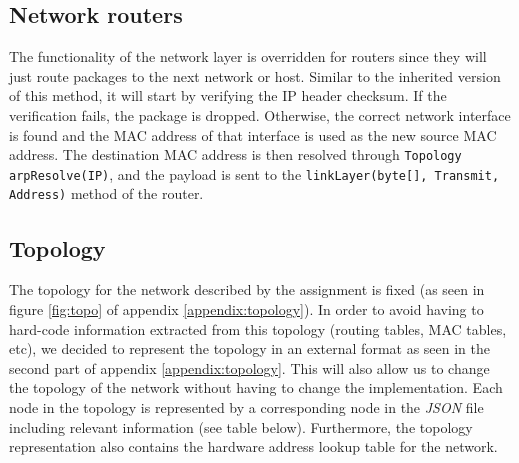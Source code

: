 \documentclass{scrartcl}
\begin{document}
\subsection{Network routers}
The functionality of the network layer is overridden for routers since they will just route packages to the next network or host. Similar to the inherited version of this method, it will start by verifying the IP header checksum. If the verification fails, the package is dropped. Otherwise, the correct network interface is found and the MAC address of that interface is used as the new source MAC address. The destination MAC address is then resolved through \texttt{Topology arpResolve(IP)},  and the payload is sent to the \texttt{linkLayer(byte[], Transmit, Address)} method of the router.

\subsection{Topology}
The topology for the network described by the assignment is fixed (as seen in figure \ref{fig:topo} of appendix \ref{appendix:topology}). In order to avoid having to hard-code information extracted from this topology (routing tables, MAC tables, etc), we decided to represent the topology in an external format as seen in the second part of appendix \ref{appendix:topology}. This will also allow us to change the topology of the network without having to change the implementation. Each node in the topology is represented by a corresponding node in the \textit{JSON} file including relevant information (see table below). Furthermore, the topology representation also contains the hardware address lookup table for the network.
\end{document}
